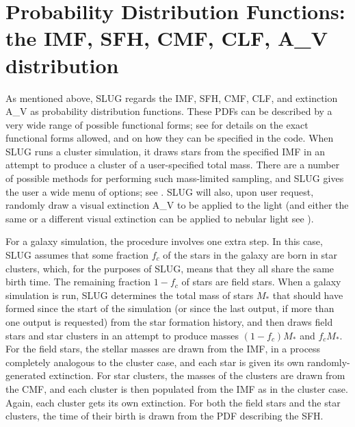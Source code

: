 \documentclass[letterpaper,10pt,english]{sphinxmanual}
\begin{document}
\section{Probability Distribution Functions: the IMF, SFH, CMF, CLF, A\_V distribution}
\label{\detokenize{intro:probability-distribution-functions-the-imf-sfh-cmf-clf-a-v-distribution}}\label{\detokenize{intro:ssec-slugpdfs}}
As mentioned above, SLUG regards the IMF, SFH, CMF, CLF, and extinction A\_V as probability distribution functions. These PDFs can be described by a very wide range of possible functional forms; see {\hyperref[\detokenize{pdfs:sec-pdfs}]{}} for details on the exact functional forms allowed, and on how they can be specified in the code. When SLUG runs a cluster simulation, it draws stars from the specified IMF in an attempt to produce a cluster of a user-specified total mass. There are a number of possible methods for performing such mass-limited sampling, and SLUG gives the user a wide menu of options; see {\hyperref[\detokenize{pdfs:sec-pdfs}]{}}. SLUG will also, upon user request, randomly draw a visual extinction A\_V to be applied to the light (and either the same or a different visual extinction can be applied to nebular light \textendash{} see {\hyperref[\detokenize{intro:ssec-nebula}]{}}).

For a galaxy simulation, the procedure involves one extra step. In this case, SLUG assumes that some fraction \(f_c\) of the stars in the galaxy are born in star clusters, which, for the purposes of SLUG, means that they all share the same birth time. The remaining fraction \(1-f_c\) of stars are field stars. When a galaxy simulation is run, SLUG determines the total mass of stars \(M_*\) that should have formed since the start of the simulation (or since the last output, if more than one output is requested) from the star formation history, and then draws field stars and star clusters in an attempt to produce masses \((1-f_c)M_*\) and \(f_c M_*\). For the field stars, the stellar masses are drawn from the IMF, in a process completely analogous to the cluster case, and each star is given its own randomly-generated extinction. For star clusters, the masses of the clusters are drawn from the CMF, and each cluster is then populated from the IMF as in the cluster case. Again, each cluster gets its own extinction. For both the field stars and the star clusters, the time of their birth is drawn from the PDF describing the SFH.
\end{document}

